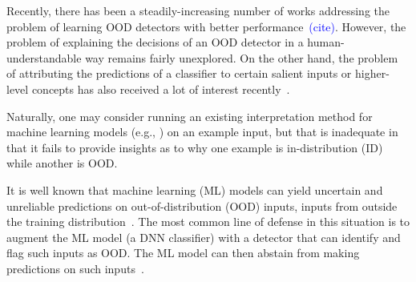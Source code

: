 Recently, there has been a steadily-increasing number of works addressing the problem of learning 
OOD detectors with better performance~\textcolor{blue}{(cite)}. 
However, the problem of explaining the decisions of an OOD detector in a human-understandable way remains fairly unexplored.
On the other hand, the problem of attributing the predictions of a classifier to certain salient inputs or higher-level concepts has also received a lot of interest recently~\cite{yeh2019completeness,kim2018tcav}.


Naturally, one may consider running an existing interpretation method for machine learning models (e.g., \cite{kim2018tcav, ghorbani2019ace}) on an example input, but that is inadequate in that it fails to provide insights as to why one example is in-distribution (ID) while another is OOD.




It is well known that machine learning (ML) models can yield uncertain and unreliable predictions on out-of-distribution (OOD) inputs, \ie inputs from outside the training distribution~\citep{amodei2016AISafety,goodfellow2015explaining,nguyen2015posterior}.
The most common line of defense in this situation is to augment the ML model (\eg a DNN classifier) with a detector that can identify and flag such inputs as OOD. The ML model can then abstain from making predictions on such inputs~\citep{hendrycks2018OE,lin2021MOOD,mohseni2020self}.






